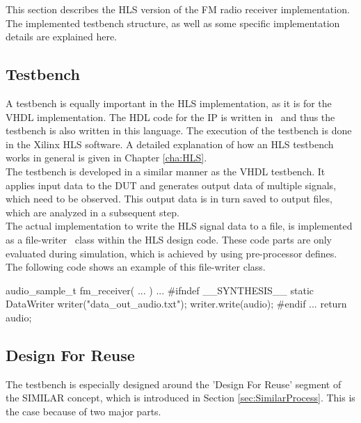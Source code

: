 This section describes the HLS version of the FM radio receiver implementation.
The implemented testbench structure, as well as some specific implementation details are explained here.

\subsection{Testbench}
\label{sec:impl:hls:testbench}

A testbench is equally important in the HLS implementation, as it is for the VHDL implementation.
The HDL code for the IP is written in \cplusplus\ and thus the testbench is also written in this language.
The execution of the testbench is done in the Xilinx HLS software.
A detailed explanation of how an HLS testbench works in general is given in Chapter \ref{cha:HLS}.\\

The testbench is developed in a similar manner as the VHDL testbench.
It applies input data to the DUT and generates output data of multiple signals, which need to be observed.
This output data is in turn saved to output files, which are analyzed in a subsequent step.\\

The actual implementation to write the HLS signal data to a file, is implemented as a file-writer \cplusplus\ class within the HLS design code.
These code parts are only evaluated during simulation, which is achieved by using pre-processor defines.
The following code shows an example of this file-writer class.\\

\begin{CppCode}
audio_sample_t fm_receiver( ... ) {
  ...
#ifndef __SYNTHESIS__
  static DataWriter writer("data_out_audio.txt");
  writer.write(audio);
#endif
  ...
  return audio;
}
\end{CppCode}


\subsection{Design For Reuse}

The testbench is especially designed around the 'Design For Reuse' segment of the SIMILAR concept, which is introduced in Section \ref{sec:SimilarProcess}.
This is the case because of two major parts.

